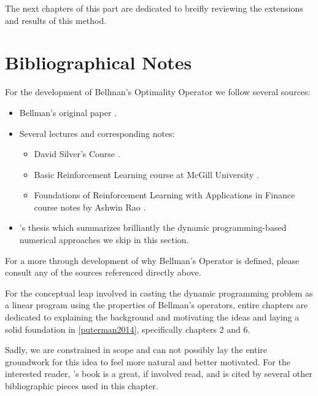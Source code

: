 The next chapters of this part are dedicated to breifly reviewing the extensions
and results of this method.


\section{Bibliographical Notes}

For the development of Bellman's Optimality Operator we follow several sources:
\begin{itemize}
    \item Bellman's original paper \cite{bellman1957}.
    \item Several lectures and corresponding notes:
    \begin{itemize}
        \item David Silver's Course \cite[Lects.~2-3]{silver2015}.
        \item Basic Reinforcement Learning course at McGill University
            \cite[Lect.~2]{moisescu-parejaa}.
        \item Foundations of Reinforcement Learning with Applications in Finance
            course notes by Ashwin Rao \cite[Lect. on Jan 15 2019]{rao2022}.
    \end{itemize}
    \item \citeauthor{nadeemward2021}'s thesis \cite{nadeemward2021} which
        summarizes brilliantly the dynamic programming-based numerical
        approaches we skip in this section.
\end{itemize}

For a more through development of why Bellman's Operator is defined, please
consult any of the sources referenced directly above.

For the conceptual leap involved in casting the dynamic programming problem as a
linear program using the properties of Bellman's operators, entire chapters are
dedicated to explaining the background and motivating the ideas and laying a
solid foundation in \ref{puterman2014}, specifically chapters 2 and 6.

Sadly, we are constrained in scope and can not possibly lay the entire
groundwork for this idea to feel more natural and better motivated. For the
interested reader, \citeauthor{puterman2014}'s book is a great, if involved
read, and is cited by several other bibliographic pieces used in this chapter.